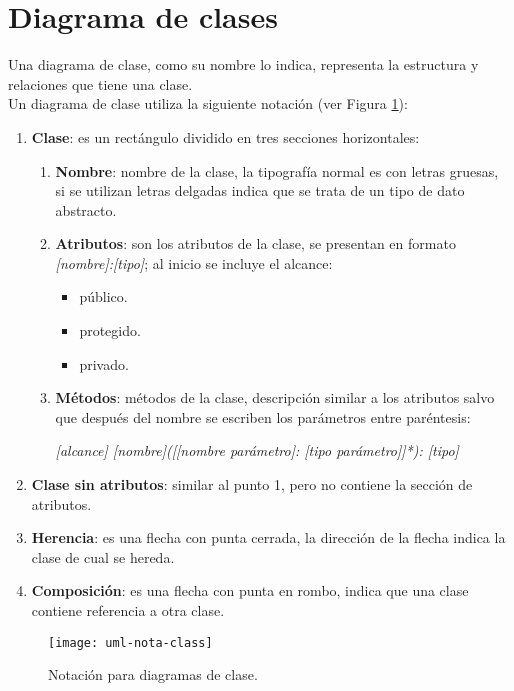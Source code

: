 \section{Diagrama de clases}\label{sec-uml-class}
Una diagrama de clase, como su nombre lo indica, representa la estructura y relaciones que tiene una clase\cite{UMLClassroom, SoftwareEngineeringUML}.\\
Un diagrama de clase utiliza la siguiente notación\cite{UMLClassroom, SoftwareEngineeringUML} (ver Figura \ref{fig:uml-nota-class}):
\begin{enumerate}
  \item \textbf{Clase}: es un rectángulo dividido en tres secciones horizontales:
  \begin{enumerate}
     \item[1.] \textbf{Nombre}: nombre de la clase, la tipografía normal es con letras gruesas, si se utilizan letras delgadas indica que se trata de un tipo de dato abstracto. 
     \item[2.] \textbf{Atributos}: son los atributos de la clase, se presentan en formato \textit{[nombre]:[tipo]}; al inicio se incluye el alcance:
     \begin{itemize}
       \item [+] público.
       \item [\#] protegido.
       \item [-] privado.
     \end{itemize}
     \item[3.] \textbf{Métodos}: métodos de la clase, descripción similar a los atributos salvo que después del nombre se escriben los parámetros entre paréntesis:
     \begin{center}
       \textit{[alcance] [nombre]([[nombre parámetro]: [tipo parámetro]]*): [tipo]}
     \end{center}
   \end{enumerate} 
  \item \textbf{Clase sin atributos}: similar al punto 1, pero no contiene la sección de atributos.
  \item \textbf{Herencia}: es una flecha con punta cerrada, la dirección de la flecha indica la clase de cual se hereda.
  \item \textbf{Composición}: es una flecha con punta en rombo, indica que una clase contiene referencia a otra clase.
\end{enumerate}

\begin{figure}[h]
  \centering
  \texttt{[image: uml-nota-class]}
  \caption{Notación para diagramas de clase\cite{SoftwareEngineeringUML}.}
  \label{fig:uml-nota-class}
\end{figure}
